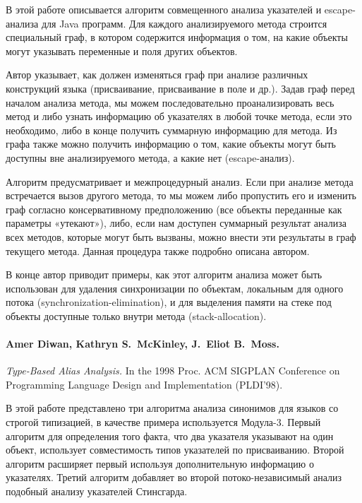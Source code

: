 \documentclass[12pt]{article}
\newcommand{\eng}[1]{{\English#1}}
\begin{document}
      В этой работе описывается алгоритм совмещенного анализа указателей и
      escape-анализа для Java программ. Для каждого анализируемого
      метода строится специальный граф, в котором содержится информация о том,
      на какие объекты могут указывать переменные и поля других объектов.

      Автор указывает, как должен изменяться граф при анализе различных
      конструкций языка (присваивание, присваивание в поле и др.).
      Задав граф перед началом анализа метода, мы можем последовательно
      проанализировать весь метод и либо узнать информацию об указателях в
      любой точке метода, если это необходимо, либо в конце получить суммарную
      информацию для метода. Из графа также можно получить информацию о том,
      какие объекты могут быть доступны вне анализируемого метода, а какие нет
      (escape-анализ).

      Алгоритм предусматривает и межпроцедурный анализ. Если при анализе
      метода встречается вызов другого метода, то мы можем либо пропустить его
      и изменить граф согласно консервативному предположению (все объекты
      переданные как параметры «утекают»), либо, если нам доступен суммарный
      результат анализа всех методов, которые могут быть вызваны, можно внести
      эти результаты в граф текущего метода. Данная процедура также подробно
      описана автором.

      В конце автор приводит примеры, как этот алгоритм анализа может быть
      использован для удаления синхронизации по объектам, локальным для одного
      потока (\eng{synchronization-elimination}), и
      для выделения памяти на стеке под объекты доступные только внутри метода
      (\eng{stack-allocation}).

    \paragraph{Amer Diwan, Kathryn S.~McKinley, J.~Eliot B.~Moss.}
      \eng{
        \textit{Type-Based Alias Analysis.}
        In the 1998 Proc. ACM SIGPLAN Conference on Programming Language
        Design and Implementation (PLDI’98).
      }

      В этой работе представлено три алгоритма анализа синонимов для языков со
      строгой типизацией, в качестве примера используется Мо\-ду\-ла-3.
      Первый алгоритм для определения того факта, что два указателя указывают
      на один объект, использует совместимость типов указателей по
      присваиванию. Второй алгоритм расширяет первый используя дополнительную
      информацию о указателях. Третий алгоритм добавляет во второй
      потоко-независимый анализ подобный анализу указателей Стинсгарда.
\end{document}
